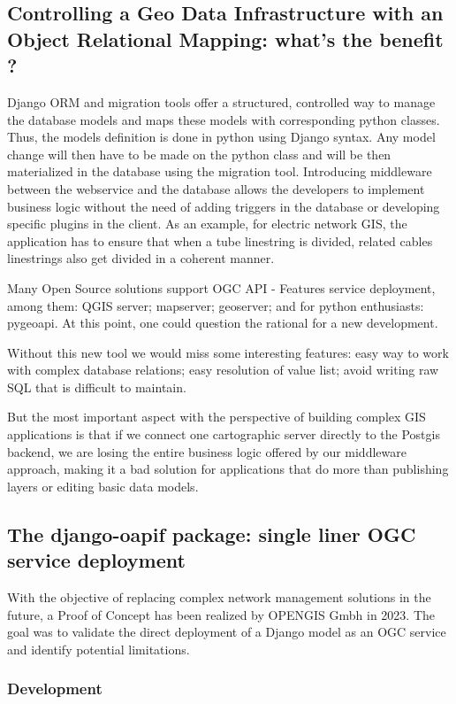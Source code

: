 \documentclass[runningheads]{llncs}
\begin{document}
\subsection{Controlling a Geo Data Infrastructure with an Object Relational Mapping: what’s the benefit ?}

 Django ORM and migration tools offer a structured, controlled way to manage the database models and maps these models with corresponding python classes. Thus, the models definition is done in python using Django syntax. Any model change will then have to be made on the python class and will be then materialized in the database using the migration tool. Introducing middleware between the webservice and the database allows the developers to implement business logic without the need of adding triggers in the database or developing specific plugins in the client. As an example, for electric network GIS, the application has to ensure that when a tube linestring is divided, related cables linestrings also get divided in a coherent manner.

Many Open Source solutions support OGC API - Features service deployment, among them: QGIS server; mapserver; geoserver; and for python enthusiasts: pygeoapi. At this point, one could question the rational for a new development. 

Without this new tool we would miss some interesting features: easy way to work with complex database relations; easy resolution of value list; avoid writing raw SQL that is difficult to maintain.

But the most important aspect with the perspective of building complex GIS applications is that if we connect one cartographic server directly to the Postgis backend, we are losing the entire business logic offered by our middleware approach, making it a bad solution for applications that do more than publishing layers or editing basic data models.
 

\subsection{The django-oapif package: single liner OGC service deployment}

With the objective of replacing complex network management solutions in the future, a Proof of Concept has been realized by OPENGIS Gmbh in 2023. The goal was to validate the direct deployment of a Django model as an OGC service and identify potential limitations.

\subsubsection{Development}
\end{document}
